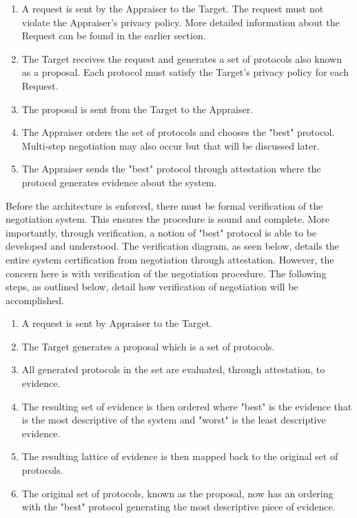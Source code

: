 \documentclass[10pt]{report}
\begin{document}
\begin{enumerate}
\item A request is sent by the Appraiser to the Target. The request must not
  violate the Appraiser's privacy policy. More detailed information about the
  Request can be found in the earlier section. 
\item The Target receives the request and generates a set of protocols also
  known as a proposal. Each protocol must satisfy the Target's privacy policy
  for each Request. 
\item The proposal is sent from the Target to the Appraiser.  
\item The Appraiser orders the set of protocols and chooses the "best" protocol.
  Multi-step negotiation may also occur but that will be discussed later. 
\item The Appraiser sends the "best" protocol through attestation where the
  protocol generates evidence about the system. 
\end{enumerate}

Before the architecture is enforced, there must be formal verification of the
negotiation system. This ensures the procedure is sound and complete. More
importantly, through verification, a notion of "best" protocol is able to be
developed and understood. The verification diagram, as seen below, details
the entire system certification from negotiation through attestation. However,
the concern here is with verification of the negotiation procedure. The
following steps, as outlined below, detail how verification of negotiation
will be accomplished.  

\begin{enumerate}
\item A request is sent by Appraiser to the Target.
\item The Target generates a proposal which is a set of protocols.
\item All generated protocols in the set are evaluated, through attestation,
  to evidence. 
\item The resulting set of evidence is then ordered where "best" is the evidence
  that is the most descriptive of the system and "worst" is the least descriptive
  evidence. 
\item The resulting lattice of evidence is then mapped back to the original set
  of protocols. 
\item The original set of protocols, known as the proposal, now has an ordering
  with the "best" protocol generating the most descriptive piece of evidence.
\end{enumerate}
\end{document}
